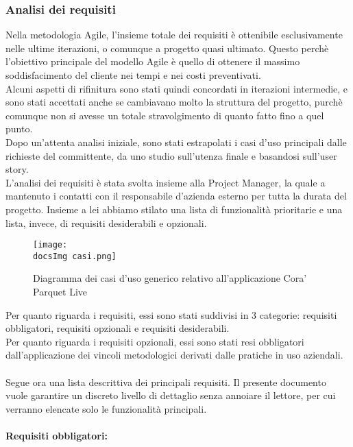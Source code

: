 \subsubsection{Analisi dei requisiti}
Nella metodologia Agile, l'insieme totale dei requisiti \`e ottenibile esclusivamente nelle ultime iterazioni, o comunque a progetto quasi ultimato. Questo perch\`e l'obiettivo principale del modello Agile \`e quello di ottenere il massimo soddisfacimento del cliente nei tempi e nei costi preventivati.\\
Alcuni aspetti di rifinitura sono stati quindi concordati in iterazioni intermedie, e sono stati accettati anche se cambiavano molto la struttura del progetto, purch\`e comunque non si avesse un totale stravolgimento di quanto fatto fino a quel punto.\\
Dopo un'attenta analisi iniziale, sono stati estrapolati i casi d'uso principali dalle richieste del committente, da uno studio sull'utenza finale e basandosi sull'user story.\\
L'analisi dei requisiti \`e stata svolta insieme alla Project Manager, la quale a mantenuto i contatti con il responsabile d'azienda esterno per tutta la durata del progetto. Insieme a lei abbiamo stilato una lista di funzionalit\`a prioritarie e una lista, invece, di requisiti desiderabili e opzionali.

\begin{figure}[H]
	\centering
	\texttt{[image: \\docsImg casi.png]}
	\caption{Diagramma dei casi d'uso generico relativo all'applicazione Cora' Parquet Live}
	\label{fig:Diagramma dei casi d'uso generico relativo all'applicazione Cora' Parquet Live}
\end{figure}

Per quanto riguarda i requisiti, essi sono stati suddivisi in 3 categorie: requisiti obbligatori, requisiti opzionali e requisiti desiderabili.\\
Per quanto riguarda i requisiti opzionali, essi sono stati resi obbligatori dall'applicazione dei vincoli metodologici derivati dalle pratiche in uso aziendali.\\\\
Segue ora una lista descrittiva dei principali requisiti. Il presente documento vuole garantire un discreto livello di dettaglio senza annoiare il lettore, per cui verranno elencate solo le funzionalit\`a principali.\\\\

\textbf{Requisiti obbligatori:}

